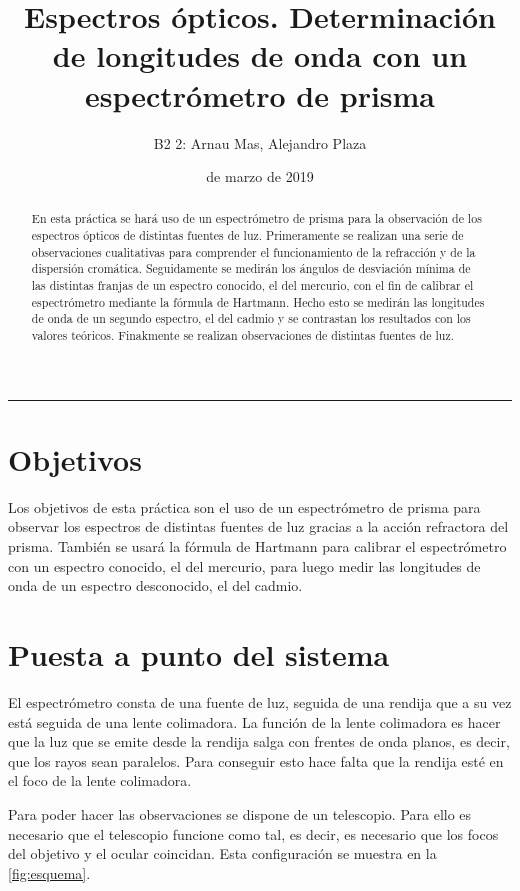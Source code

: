 \documentclass[12pt]{article}
\title{\sffamily {\bfseries Práctica 4:} Espectros ópticos. Determinación de longitudes de onda con un espectrómetro de prisma}
\author{\sffamily B2 2: Arnau Mas, Alejandro Plaza}
\date{\sffamily 14 de marzo de 2019}
\numberwithin{table}{section}
\numberwithin{figure}{section}
\numberwithin{equation}{section}
\begin{document}
\maketitle
\renewcommand{\abstractname}{\sffamily \bfseries Resumen:}
\begin{abstract}
	En esta práctica se hará uso de un espectrómetro de prisma para la observación de los espectros ópticos de distintas fuentes de luz. Primeramente se realizan una serie de observaciones cualitativas para comprender el funcionamiento de la refracción y de la dispersión cromática. Seguidamente se medirán los ángulos de desviación mínima de las distintas franjas de un espectro conocido, el del mercurio, con el fin de calibrar el espectrómetro mediante la fórmula de Hartmann. Hecho esto se medirán las longitudes de onda de un segundo espectro, el del cadmio y se contrastan los resultados con los valores teóricos. Finakmente se realizan observaciones de distintas fuentes de luz.
\end{abstract}
\hrule

\section{Objetivos}
Los objetivos de esta práctica son el uso de un espectrómetro de prisma para observar los espectros de distintas fuentes de luz gracias a la acción refractora del prisma. También se usará la fórmula de Hartmann para calibrar el espectrómetro con un espectro conocido, el del mercurio, para luego medir las longitudes de onda de un espectro desconocido, el  del cadmio.

\section{Puesta a punto del sistema}
El espectrómetro consta de una fuente de luz, seguida de una rendija que a su vez está seguida de una lente colimadora. La función de la lente colimadora es hacer que la luz que se emite desde la rendija salga con frentes de onda planos, es decir, que los rayos sean paralelos. Para conseguir esto hace falta que la rendija esté en el foco de la lente colimadora. 

Para poder hacer las observaciones se dispone de un telescopio. Para ello es necesario que el telescopio funcione como tal, es decir, es necesario que los focos del objetivo y el ocular coincidan. Esta configuración se muestra en la \cref{fig:esquema}.
\end{document}
